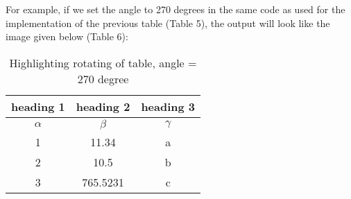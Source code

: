 \documentclass{article}
\begin{document}
For example, if we set the angle to 270 degrees in the same code as used for
the implementation of the previous table (Table 5), the output will look like the
image given below (Table 6):
\begin{table}[h!]
\centering
\begin{adjustbox}{angle=270}
\begin{tabular}{|c|c|c|}
\hline
heading 1 & heading 2 & heading 3 \\
\hline
$\alpha$ & $\beta$ & $\gamma$ \\
1 & 11.34 & a \\
2 & 10.5 & b \\
3 & 765.5231 & c \\
\hline
\end{tabular}
\end{adjustbox}
\caption{Highlighting rotating of table, angle = 270 degree}
\label{tab:sample9}
\end{table}
\end{document}
